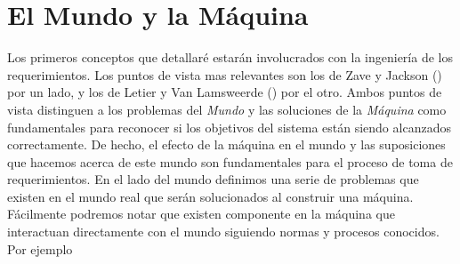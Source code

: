 \section{El Mundo y la Máquina}

Los primeros conceptos que detallaré estarán involucrados con la ingeniería de los requerimientos. Los puntos de vista
mas relevantes son los de Zave y Jackson (\cite{Zave97fourdark, Jackson:1995:SRA:210207, 5071113}) por un lado, y los de
Letier y Van Lamsweerde (\cite{879820, VanLamsweerde:2001:GRE:882477.883624}) por el otro. Ambos puntos de vista
distinguen a los problemas del \emph{Mundo} y las soluciones de la \emph{Máquina} como fundamentales para reconocer si los
objetivos del sistema están siendo alcanzados correctamente. De hecho, el efecto de la máquina en el mundo y las
suposiciones que hacemos acerca de este mundo son fundamentales para el proceso de toma de requerimientos. En el lado
del mundo definimos una serie de problemas que existen en el mundo real que serán solucionados al construir una máquina.
Fácilmente podremos notar que existen componente en la máquina que interactuan directamente con el mundo siguiendo
normas y procesos conocidos. Por ejemplo
